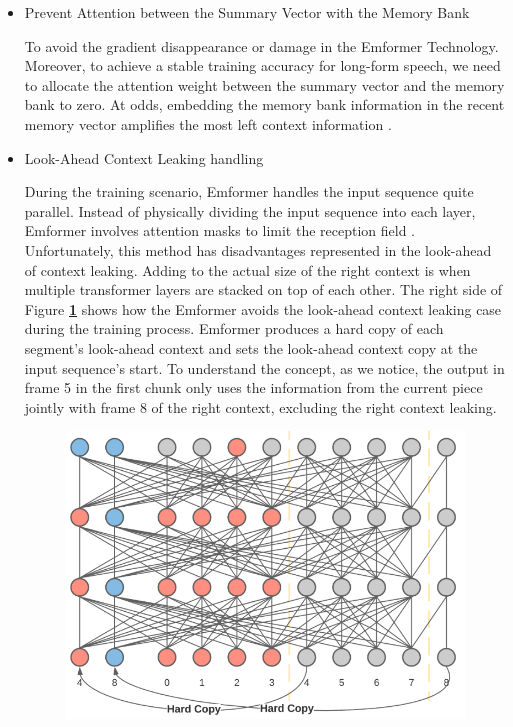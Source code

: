 \begin{itemize}
 \item Prevent Attention between the Summary Vector with the Memory Bank

To avoid the gradient disappearance or damage in the Emformer Technology. Moreover, to achieve a stable training accuracy for long-form speech, we need to allocate the attention weight between the summary vector and the memory bank to zero. At odds, embedding the memory bank information in the recent memory vector amplifies the most left context information \cite{shi2021emformer}.  


 \item Look-Ahead Context Leaking handling

During the training scenario, Emformer handles the input sequence quite parallel. Instead of physically dividing the input sequence into each layer, Emformer involves attention masks to limit the reception field \cite{dai2019transformer,chen2021developing}. Unfortunately, this method has disadvantages represented in the look-ahead of context leaking. Adding to the actual size of the right context is when multiple transformer layers are stacked on top of each other. The right side of
 Figure \textbf{\ref{fig:Avoiding-look-ahead-context-leaking}} shows how the Emformer avoids the look-ahead context leaking case during the training process. Emformer produces a hard copy of each segment's look-ahead context and sets the look-ahead context copy at the input sequence's start. To understand the concept, as we notice, the output in frame 5 in the first chunk only uses the information from the current piece jointly with frame 8 of the right context, excluding the right context leaking.

 

 

\begin{figure}[!ht]
	\centering
	\includegraphics[width=0.8 \textwidth]{images/Avoiding-look-ahead-context-leaking.png}\\
	\caption{ Representative of preventing look-ahead context leaking. Considering that:\\
	The chunk size value is 4, and the right context size is 1}
    \caption*{\cite{shi2021emformer}}
	\label{fig:Avoiding-look-ahead-context-leaking}
\end{figure}


\end{itemize}





